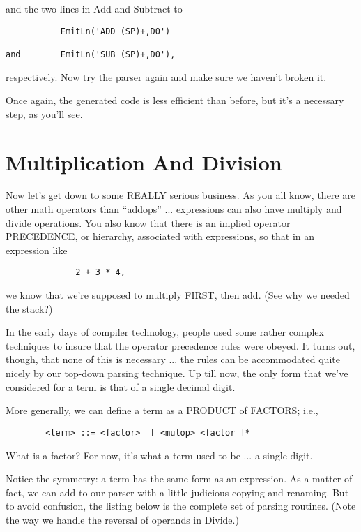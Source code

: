 and the two lines in Add and Subtract to

\begin{verbatim}
           EmitLn('ADD (SP)+,D0')

and        EmitLn('SUB (SP)+,D0'),
\end{verbatim}

respectively. Now try the parser again and make sure  we haven't broken it.

Once again, the generated code is less efficient than before, but it's a necessary step, as you'll see.

\section{Multiplication And Division}

Now let's get down to some REALLY serious business. As  you  all know, there  are  other  math   operators   than   ``addops''  ... expressions can also have  multiply  and  divide operations. You also  know  that  there  is  an implied operator  PRECEDENCE, or hierarchy, associated with expressions, so that in  an expression like

\begin{verbatim}
              2 + 3 * 4,
\end{verbatim}

we know that we're supposed to multiply FIRST, then  add. (See why we needed the stack?)

In the early days of compiler technology, people used some rather complex techniques to insure that the  operator  precedence rules were  obeyed. It turns out, though, that  none  of  this  is necessary ... the rules can be accommodated quite  nicely  by our top-down  parsing technique. Up till now, the  only  form  that we've considered for a term is that of a  single  decimal  digit.

More generally, we  can  define  a  term as a PRODUCT of FACTORS; i.e.,

\begin{verbatim}
        <term> ::= <factor>  [ <mulop> <factor ]*
\end{verbatim}

What  is  a factor?  For now, it's what a term used to be  ... a single digit.

Notice the symmetry: a  term  has the same form as an expression. As a matter of fact, we can  add  to  our  parser  with  a little judicious  copying and renaming. But  to  avoid  confusion, the listing below is the complete set of parsing routines. (Note the way we handle the reversal of operands in Divide.)

